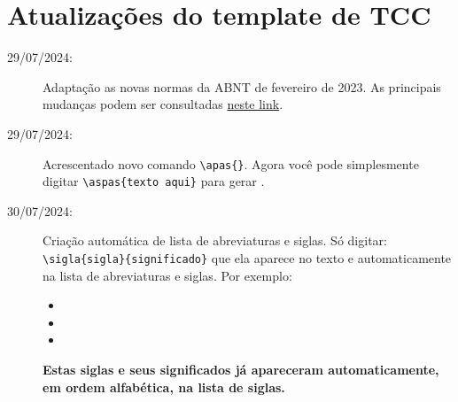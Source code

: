 \section{Atualizações do template de TCC}
\begin{description}
     \item[29/07/2024:] Adaptação as novas normas da ABNT de fevereiro de 2023. As principais mudanças podem ser consultadas \href{https://waldexifba.wordpress.com/2024/07/26/norma-abnt-principais-mudancas-e-atualizacoes-em-citacoes/}{neste link}.
     \item[29/07/2024:] Acrescentado novo comando \verb|\apas{}|. Agora você pode simplesmente digitar \verb|\aspas{texto aqui}| para gerar .
     \item[30/07/2024:] Criação automática de lista de abreviaturas e siglas. Só digitar:\\  \verb|\sigla{sigla}{significado}| que ela aparece no texto e automaticamente na lista de abreviaturas e  siglas. Por exemplo:
     \begin{itemize}
         \item {}
         \item          {}
         \item {}
     \end{itemize}
    \textbf{Estas siglas e seus significados já apareceram automaticamente, em ordem alfabética,  na lista de siglas.} 
    

\end{description}
